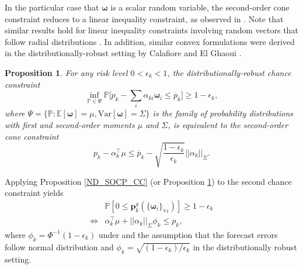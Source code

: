 \documentclass{article}
\newtheorem{proposition}{Proposition}
\begin{document}
In the particular case that $\boldsymbol{\omega}$ is a scalar random variable, the second-order cone constraint reduces to a linear inequality constraint, as observed in \cite{Dvorkin2020}. Note that similar results hold for linear inequality constraints involving random vectors that follow radial distributions \cite{Calafiore2006}. In addition, similar convex formulations were derived in the distributionally-robust setting by Calafiore and El Ghaoui \cite{Calafiore2006}.

\begin{proposition}\label{DR_SOCP_CC}
For any risk level $0 < \epsilon_k < 1$, the distributionally-robust chance constraint
\begin{equation*}
\inf_{\mathbb{P} \in \Psi} \mathbb{P}\Big[p_k - \sum_i \alpha_{ki} \boldsymbol{\omega}_i \le \overline{p}_k\Big] \ge 1 - \epsilon_k,
\end{equation*}
where $\Psi = \{\mathbb{P}: \mathbb{E}[\boldsymbol{\omega}] = \mu, \mbox{Var}[\boldsymbol{\omega}] = \Sigma\}$ is the family of probability distributions with first and second-order moments $\mu$ and $\Sigma$, is equivalent to the second-order cone constraint
\begin{equation*}
p_k - \alpha_k^\top \mu \le \overline{p}_k - \sqrt{\frac{1-\epsilon_k}{\epsilon_k}} ||\alpha_k||_{\Sigma}.
\end{equation*}
\end{proposition}

Applying Proposition \ref{ND_SOCP_CC} (or Proposition \ref{DR_SOCP_CC}) to the second chance constraint yields
\begin{align*}
&\mathbb{P}[0 \le \mathbf{p}_k^g(\{\boldsymbol{\omega}_i\}_{\forall i})] \ge 1 - \epsilon_k\\
\Leftrightarrow & \alpha_k^\top \mu + ||\alpha_k||_{\Sigma} \phi_k \le p_k,
\end{align*}
where $\phi_k = \Phi^{-1}(1 - \epsilon_k)$ under and the assumption that the forecast errors follow normal distribution and $\phi_k = \sqrt{(1-\epsilon_k)/\epsilon_k}$ in the distributionally robust setting.
\end{document}
